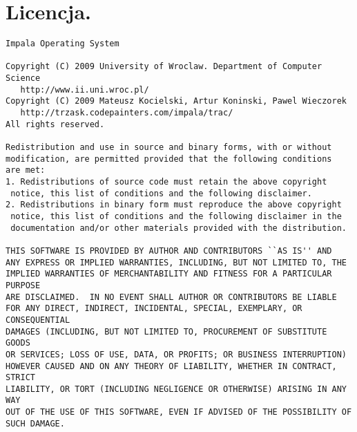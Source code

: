 \chapter{Licencja.}

\begin{verbatim}
Impala Operating System

Copyright (C) 2009 University of Wroclaw. Department of Computer Science
   http://www.ii.uni.wroc.pl/
Copyright (C) 2009 Mateusz Kocielski, Artur Koninski, Pawel Wieczorek
   http://trzask.codepainters.com/impala/trac/
All rights reserved.

Redistribution and use in source and binary forms, with or without
modification, are permitted provided that the following conditions
are met:
1. Redistributions of source code must retain the above copyright
 notice, this list of conditions and the following disclaimer.
2. Redistributions in binary form must reproduce the above copyright
 notice, this list of conditions and the following disclaimer in the
 documentation and/or other materials provided with the distribution.

THIS SOFTWARE IS PROVIDED BY AUTHOR AND CONTRIBUTORS ``AS IS'' AND
ANY EXPRESS OR IMPLIED WARRANTIES, INCLUDING, BUT NOT LIMITED TO, THE
IMPLIED WARRANTIES OF MERCHANTABILITY AND FITNESS FOR A PARTICULAR PURPOSE
ARE DISCLAIMED.  IN NO EVENT SHALL AUTHOR OR CONTRIBUTORS BE LIABLE
FOR ANY DIRECT, INDIRECT, INCIDENTAL, SPECIAL, EXEMPLARY, OR CONSEQUENTIAL
DAMAGES (INCLUDING, BUT NOT LIMITED TO, PROCUREMENT OF SUBSTITUTE GOODS
OR SERVICES; LOSS OF USE, DATA, OR PROFITS; OR BUSINESS INTERRUPTION)
HOWEVER CAUSED AND ON ANY THEORY OF LIABILITY, WHETHER IN CONTRACT, STRICT
LIABILITY, OR TORT (INCLUDING NEGLIGENCE OR OTHERWISE) ARISING IN ANY WAY
OUT OF THE USE OF THIS SOFTWARE, EVEN IF ADVISED OF THE POSSIBILITY OF
SUCH DAMAGE.
\end{verbatim}

